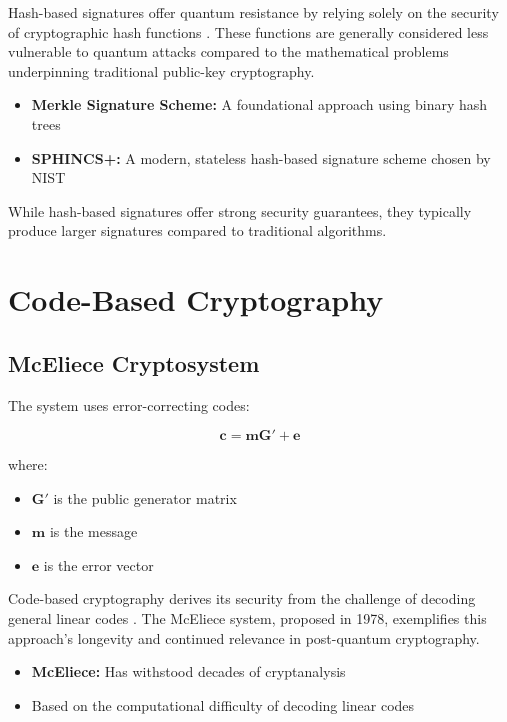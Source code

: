 Hash-based signatures offer quantum resistance by relying solely on the security of cryptographic hash functions \parencite{bernstein2017post}. These functions are generally considered less vulnerable to quantum attacks compared to the mathematical problems underpinning traditional public-key cryptography.

\begin{itemize}
    \item \textbf{Merkle Signature Scheme:} A foundational approach using binary hash trees
    \item \textbf{SPHINCS+:} A modern, stateless hash-based signature scheme chosen by NIST
\end{itemize}

While hash-based signatures offer strong security guarantees, they typically produce larger signatures compared to traditional algorithms.

\section{Code-Based Cryptography}\label{sec:code_based}

\subsection{McEliece Cryptosystem}\label{subsec:mceliece}
The system uses error-correcting codes:

\begin{equation}\label{eq:mceliece}
    \mathbf{c} = \mathbf{mG'} + \mathbf{e}
\end{equation}

where:
\begin{itemize}
    \item $\mathbf{G'}$ is the public generator matrix
    \item $\mathbf{m}$ is the message
    \item $\mathbf{e}$ is the error vector
\end{itemize}

Code-based cryptography derives its security from the challenge of decoding general linear codes \parencite{bernstein2017post}. The McEliece system, proposed in 1978, exemplifies this approach's longevity and continued relevance in post-quantum cryptography.

\begin{itemize}
    \item \textbf{McEliece:} Has withstood decades of cryptanalysis
    \item Based on the computational difficulty of decoding linear codes
\end{itemize}

